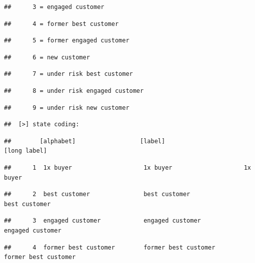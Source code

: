 \documentclass[
]{book}
\begin{document}
\begin{verbatim}
##      3 = engaged customer
\end{verbatim}

\begin{verbatim}
##      4 = former best customer
\end{verbatim}

\begin{verbatim}
##      5 = former engaged customer
\end{verbatim}

\begin{verbatim}
##      6 = new customer
\end{verbatim}

\begin{verbatim}
##      7 = under risk best customer
\end{verbatim}

\begin{verbatim}
##      8 = under risk engaged customer
\end{verbatim}

\begin{verbatim}
##      9 = under risk new customer
\end{verbatim}

\begin{verbatim}
##  [>] state coding:
\end{verbatim}

\begin{verbatim}
##        [alphabet]                  [label]                     [long label]
\end{verbatim}

\begin{verbatim}
##      1  1x buyer                    1x buyer                    1x buyer
\end{verbatim}

\begin{verbatim}
##      2  best customer               best customer               best customer
\end{verbatim}

\begin{verbatim}
##      3  engaged customer            engaged customer            engaged customer
\end{verbatim}

\begin{verbatim}
##      4  former best customer        former best customer        former best customer
\end{verbatim}
\end{document}
